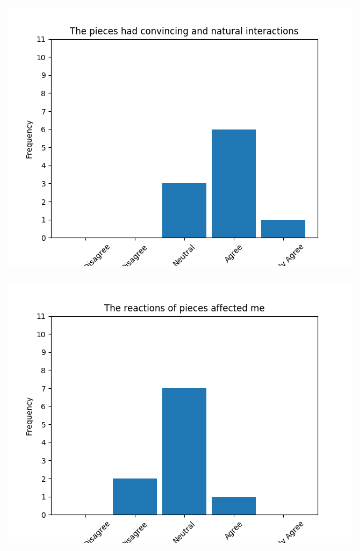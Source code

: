 \documentclass{article}
\begin{document}
\begin{figure}[!ht]
\begin{subfigure}{.5\textwidth}
\end{subfigure}%
\begin{subfigure}{.5\textwidth}
    \centering
    \includegraphics[width=\textwidth]{images/questions/13}
\end{subfigure}
\begin{subfigure}{.5\textwidth}
    \centering
    \includegraphics[width=\textwidth]{images/questions/14}
\end{subfigure}%
\begin{subfigure}{.5\textwidth}
    \centering

\end{subfigure}
\end{figure}
\end{document}
